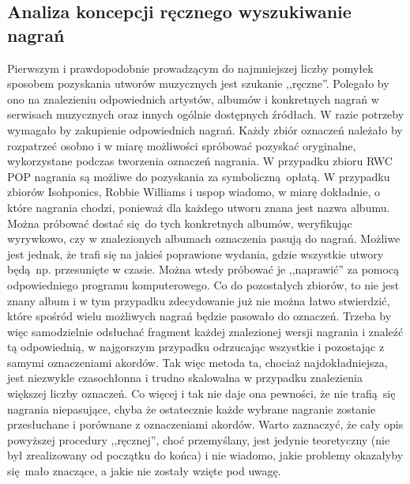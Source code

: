 \subsection{Analiza koncepcji ręcznego wyszukiwanie nagrań} Pierwszym i prawdopodobnie
prowadzącym do najmniejszej liczby pomyłek sposobem pozyskania utworów muzycznych jest szukanie
,,ręczne''. Polegało by ono na znalezieniu odpowiednich artystów, albumów i konkretnych nagrań w
serwisach muzycznych oraz innych ogólnie dostępnych źródłach. W razie potrzeby wymagało by
zakupienie odpowiednich nagrań. Każdy zbiór oznaczeń należało by rozpatrzeć osobno i w miarę
możliwości spróbować pozyskać oryginalne, wykorzystane podczas tworzenia oznaczeń nagrania. W
przypadku zbioru RWC POP nagrania są możliwe do pozyskania za symboliczną opłatą. W przypadku
zbiorów Isohponics, Robbie Williams i uspop wiadomo, w miarę dokładnie, o które nagrania chodzi,
ponieważ dla każdego utworu znana jest nazwa albumu. Można próbować dostać się do tych konkretnych
albumów, weryfikując wyrywkowo, czy w znalezionych albumach oznaczenia pasują do nagrań. Możliwe
jest jednak, że trafi się na jakieś poprawione wydania, gdzie wszystkie utwory będą np. przesunięte
w czasie. Można wtedy próbować je ,,naprawić'' za pomocą odpowiedniego programu komputerowego. Co do
pozostałych zbiorów, to nie jest znany album i w tym przypadku zdecydowanie już nie można łatwo
stwierdzić, które spośród wielu możliwych nagrań będzie pasowało do oznaczeń. Trzeba by więc
samodzielnie odsłuchać fragment każdej znalezionej wersji nagrania i znaleźć tą odpowiednią, w
najgorszym przypadku odrzucając wszystkie i pozostając z samymi oznaczeniami akordów. Tak więc
metoda ta, chociaż najdokładniejsza, jest niezwykle czasochłonna i trudno skalowalna w przypadku
znalezienia większej liczby oznaczeń.  Co więcej i tak nie daje ona pewności, że nie trafią się
nagrania niepasujące, chyba że ostatecznie każde wybrane nagranie zostanie przesłuchane i porównane
z oznaczeniami akordów. Warto zaznaczyć, że cały opis powyższej procedury ,,ręcznej'', choć
przemyślany, jest jedynie teoretyczny (nie był zrealizowany od początku do końca) i nie wiadomo,
jakie problemy okazałyby się mało znaczące, a jakie nie zostały wzięte pod uwagę. 

